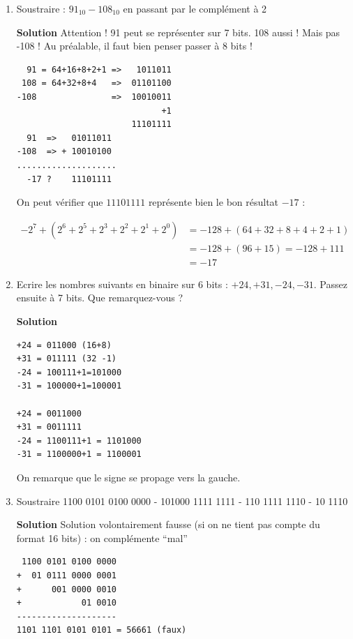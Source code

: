 \documentclass[a4paper,11pt]{article}
\begin{document}
\begin{enumerate}
{\bf Solution}
On applique la formule (1) de l'énoncé : on inverse tous les bits et on ajoute 1 :
$$8=1000_2 \implies C_{2,6}(8)=110111+1=111000 $$
On applique la formule (2) de l'énoncé :
$-2^5+2^4+2^3=-8$
Cela signifie que $111000$ est bien la valeur -8 représentée en complément à 2.


\item {Soustraire : $91_{10}-108_{10}$ en passant par le complément à 2}

{\bf Solution}
Attention ! 91 peut se représenter sur 7 bits. 108 aussi ! Mais pas -108 ! Au préalable, il faut bien penser passer à 8 bits !
\begin{verbatim}
  91 = 64+16+8+2+1 =>   1011011
 108 = 64+32+8+4   =>  01101100
-108               =>  10010011
                             +1
                       11101111
  91  =>   01011011
-108  => + 10010100
....................
  -17 ?    11101111
\end{verbatim}

On peut vérifier que $11101111$ représente bien le bon résultat $-17$ :

\begin{align}
-2^7+(2^6+2^5+2^3+2^2+2^1+2^0) &= -128+(64+32+8+4+2+1) \nonumber \\
                             &= -128+(96+15)=-128+111 \nonumber\\
                             &=-17 \nonumber
\end{align}

\item {Ecrire les nombres suivants en binaire sur 6 bits : $+24,+31,-24,-31$. Passez ensuite à 7 bits. Que remarquez-vous ?}

{\bf Solution}
\begin{verbatim}
+24 = 011000 (16+8)
+31 = 011111 (32 -1)
-24 = 100111+1=101000
-31 = 100000+1=100001

+24 = 0011000
+31 = 0011111
-24 = 1100111+1 = 1101000
-31 = 1100000+1 = 1100001
\end{verbatim}

On remarque que le signe se propage vers la gauche.

\item { Soustraire 1100 0101 0100 0000 - 101000 1111 1111 - 110 1111 1110 - 10 1110}


{\bf Solution}
Solution volontairement fausse (si on ne tient pas compte du format 16 bits) : on complémente ``mal''
\begin{verbatim}
 1100 0101 0100 0000
+  01 0111 0000 0001
+      001 0000 0010
+            01 0010
--------------------
1101 1101 0101 0101 = 56661 (faux)


\end{verbatim}
\end{enumerate}
\end{document}
